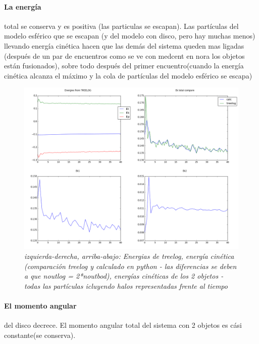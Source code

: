\documentclass[12pt]{article} %
\renewcommand{\=}[1]{\stackrel{#1}{=}} %
\theoremstyle{definition}
\theoremstyle{remark}
\begin{document}
\clearpage
\paragraph{La energía} total se conserva y es positiva (las particulas se escapan). Las partículas del modelo esférico que se escapan 
(y del modelo con disco, pero hay muchas menos) llevando energía cinética hacen que las demás del  sistema queden mas ligadas (después de un par de encuentros como se ve con medcent en nora los objetos están fusionados), sobre todo después del primer encuentro(cuando la energía cinética alcanza el máximo y la cola de partículas del modelo esférico se  escapa) 


\begin{figure}[!ht]
 \centering
 \includegraphics[scale=0.2]{sep590deg-energy.png}
 \caption{\emph{izquierda-derecha, arriba-abajo: Energias de treelog, energía cinética (comparación treelog y calculado en python - las diferencias se deben a que noutlog = 2*noutbod), energías cinéticas de los 2 objetos - todas las partículas icluyendo halos  representadas frente al tiempo}}
\end{figure}


\clearpage
\paragraph{El momento angular} del disco decrece. 
El momento angular total del sistema con 2 objetos es cási constante(se conserva).
\end{document}
